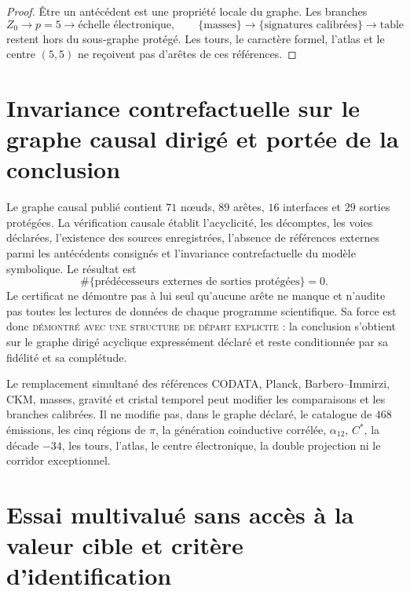 \begin{proof}
Être un antécédent est une propriété locale du graphe. Les branches
\[
 Z_0\longrightarrow p=5\longrightarrow\text{échelle électronique},
\qquad
 \{\text{masses}\}\longrightarrow\{\text{signatures calibrées}\}
 \longrightarrow\text{table}
\]
restent hors du sous-graphe protégé. Les tours, le caractère formel,
l'atlas et le centre \((5,5)\) ne reçoivent pas d'arêtes de ces références.
\end{proof}

\section{Invariance contrefactuelle sur le graphe causal dirigé et portée de la conclusion}
\label{sec:certificado-independencia-prospectiva}

Le graphe causal publié contient \(71\) nœuds, \(89\) arêtes,
\(16\) interfaces et
\(29\) sorties protégées. La vérification causale établit l'acyclicité, les décomptes,
les voies déclarées, l'existence des sources enregistrées, l'absence de
références externes parmi les antécédents consignés et l'invariance
contrefactuelle du modèle symbolique. Le résultat est
\[
 \#\{\text{prédécesseurs externes de sorties protégées}\}=0.
\]
Le certificat ne démontre pas à lui seul qu'aucune arête ne manque et n'audite pas
toutes les lectures de données de chaque programme scientifique. Sa force est donc
\textsc{démontré avec une structure de départ explicite} : la conclusion
s'obtient sur le graphe dirigé acyclique expressément déclaré et reste
conditionnée par sa fidélité et sa complétude.

Le remplacement simultané des références CODATA, Planck,
Barbero--Immirzi, CKM, masses, gravité et cristal temporel peut modifier les
comparaisons et les branches calibrées. Il ne modifie pas, dans le graphe déclaré,
le catalogue de \(468\) émissions, les cinq régions de \(\pi\), la
génération coinductive corrélée, \(\alpha_{12}\), \(C^\ast\), la décade \(-34\), les tours,
l'atlas, le centre électronique, la double projection ni le corridor
exceptionnel.

\section{Essai multivalué sans accès à la valeur cible et critère d'identification}
\label{sec:protocolo-ciego-multivaluado}

